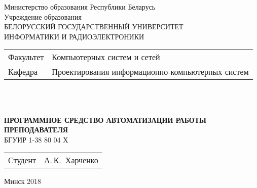 \begin{titlepage}
  \begin{center}
    Министерство образования Республики Беларусь\\[1em]
    Учреждение образования\\
    БЕЛОРУССКИЙ ГОСУДАРСТВЕННЫЙ УНИВЕРСИТЕТ \\
    ИНФОРМАТИКИ И РАДИОЭЛЕКТРОНИКИ\\[1em]

    \begin{minipage}{\textwidth}
      \begin{flushleft}
        \begin{tabular}{ l l }
          Факультет & Компьютерных систем и сетей\\
          Кафедра   & Проектирования информационно-компьютерных систем
        \end{tabular}
      \end{flushleft}
    \end{minipage}\\[3em]

	\begin{minipage}{0.4\textwidth}
		
	\end{minipage}\\[2.2em]

    \textbf{\large\MakeUppercase{Программное средство автоматизации работы преподавателя}}\\[1em]

    {БГУИР 1-38 80 04 Х}\\[2em]
    
    \begin{tabular}{ p{}p{} }
      Студент & А.\,К.~Харченко \\
    \end{tabular}
    
    \vfill
    {\normalsize Минск 2018}
  \end{center}
\end{titlepage}
